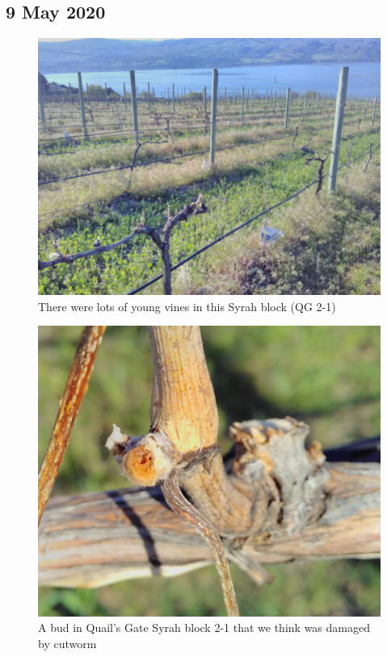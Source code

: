 \documentclass[11pt,letter]{article}
\begin{document}
\subsection{9 May 2020}
\begin{figure}%
  \includegraphics[width=\linewidth]{SyrahQGB1-2.jpg}
  \caption{There were lots of young vines in this Syrah block (QG 2-1) }
  \label{fig:SyrahSparse}
\end{figure}
\begin{figure}%
  \includegraphics[width=\linewidth]{CutwormDamageSyrahQGB1-2.jpg}
  \caption{A bud in Quail's Gate Syrah block 2-1 that we think was damaged by cutworm }
  \label{fig:SyrahCutworm}
\end{figure}
\end{document}
